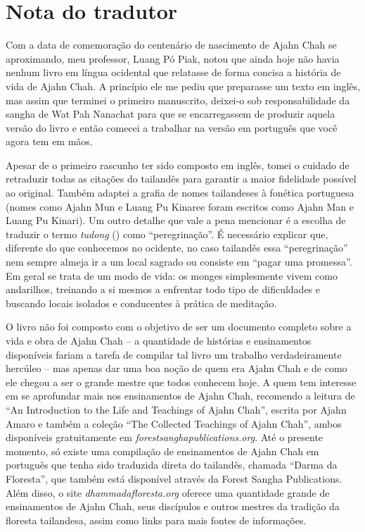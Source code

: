 \chapter{Nota do tradutor}

Com a data de comemoração do centenário de nascimento de Ajahn Chah se
aproximando, meu professor, Luang Pó Piak, notou que ainda hoje não
havia nenhum livro em língua ocidental que relatasse de forma concisa a
história de vida de Ajahn Chah. A princípio ele me pediu que preparasse
um texto em inglês, mas assim que terminei o primeiro manuscrito,
deixei-o sob responsabilidade da sangha de Wat Pah Nanachat para que se
encarregassem de produzir aquela versão do livro e então comecei a
trabalhar na versão em português que você agora tem em mãos.

Apesar de o primeiro rascunho ter sido composto em inglês, tomei o
cuidado de retraduzir todas as citações do tailandês para garantir a
maior fidelidade possível ao original. Também adaptei a grafia de nomes
tailandeses à fonética portuguesa (nomes como Ajahn Mun e Luang Pu
Kinaree foram escritos como Ajahn Man e Luang Pu Kinari). Um outro
detalhe que vale a pena mencionar é a escolha de traduzir o termo
\emph{tudong} () como ``peregrinação''. É necessário explicar que,
diferente do que conhecemos no ocidente, no caso tailandês essa
``peregrinação'' nem sempre almeja ir a um local sagrado ou consiste em
``pagar uma promessa''. Em geral se trata de um modo de vida: os monges
simplesmente vivem como andarilhos, treinando a si mesmos a enfrentar
todo tipo de dificuldades e buscando locais isolados e conducentes à
prática de meditação.

O livro não foi composto com o objetivo de ser um documento completo
sobre a vida e obra de Ajahn Chah -- a quantidade de histórias e
ensinamentos disponíveis fariam a tarefa de compilar tal livro um
trabalho verdadeiramente hercúleo -- mas apenas dar uma boa noção de
quem era Ajahn Chah e de como ele chegou a ser o grande mestre que todos
conhecem hoje. A quem tem interesse em se aprofundar mais nos
ensinamentos de Ajahn Chah, recomendo a leitura de ``An Introduction to
the Life and Teachings of Ajahn Chah'', escrita por Ajahn Amaro e também
a coleção ``The Collected Teachings of Ajahn Chah'', ambos disponíveis
gratuitamente em \emph{forestsanghapublications.org}. Até o presente
momento, só existe uma compilação de ensinamentos de Ajahn Chah em
português que tenha sido traduzida direta do tailandês, chamada ``Darma
da Floresta'', que também está disponível através da Forest Sangha
Publications. Além disso, o site \emph{dhammadafloresta.org} oferece uma
quantidade grande de ensinamentos de Ajahn Chah, seus discípulos e
outros mestres da tradição da floresta tailandesa, assim como links para
mais fontes de informações.

